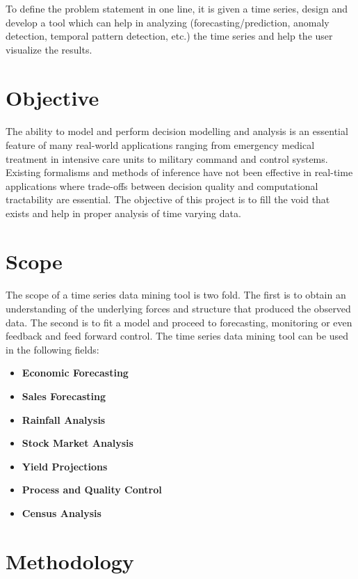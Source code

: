 \documentclass[12pt,a4paper]{report}
\begin{document}
To define the problem statement in one line, it is given a time series, design and develop a tool which can help in analyzing (forecasting/prediction, anomaly detection, temporal pattern detection, etc.) the time series and help the user visualize the results. 

\section{Objective}
\paragraph{} The ability to model and perform decision modelling and analysis is an essential feature of many real-world applications ranging from emergency medical treatment in intensive care units to military command and control systems. Existing formalisms and methods of inference have not been effective in real-time applications where trade-offs between decision quality and computational tractability are essential. The objective of this project is to fill the void that exists and help in proper analysis of time varying data.

\section{Scope}
\paragraph{} The scope of a time series data mining tool is two fold. The first  is to obtain an understanding of the underlying forces and structure that produced the observed data. The second is to 
fit a model and proceed to forecasting, monitoring or even feedback and feed forward control. The time series data mining tool can be used in the following fields: 
\begin{itemize}
\item{\textbf{Economic Forecasting}}
\item{\textbf{Sales Forecasting}}
\item{\textbf{Rainfall Analysis}}
\item{\textbf{Stock Market Analysis}}
\item{\textbf{Yield Projections}}
\item{\textbf{Process and Quality Control}}
\item{\textbf{Census Analysis}}
\end{itemize}
\section{Methodology}
\end{document}
